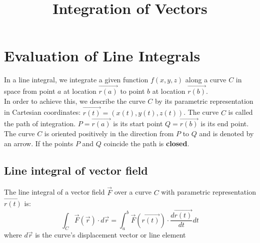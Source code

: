 \documentclass[11pt]{article}
\title{Integration of Vectors}
\begin{document}
\maketitle
    \section{Evaluation of Line Integrals}\label{sec:evaluation-of-line-integrals}
        In a line integral, we integrate a given function $f(x,y,z)$ along a curve $C$
        in space from point $a$ at location $\vec{r(a)}$ to point $b$ at location $\vec{r(b)}$.
        \\
        In order to achieve this, we describe the curve $C$ by its parametric representation in Cartesian coordinates:
        $\vec{r(t)} = (x(t), y(t), z(t))$.
        The curve $C$ is called the path of integration. $P = \vec{r(a)}$ is its start point $Q = \vec{r(b)}$ is its end point.
        The curve $C$ is oriented positively in the direction from $P$ to $Q$ and is denoted by an arrow.
        If the points $P$ and $Q$ coincide the path is \textbf{closed}.

        \subsection{Line integral of vector field}\label{subsec:line-integral-of-vector-field}
            The line integral of a vector field $\vec{F}$ over a curve $C$ with parametric representation
            $\vec{r(t)}$ is:
            \begin{equation}
                \label{eq:equation}
                \int_{C} \vec{F}(\vec{r}) \cdot d\vec{r} = \int_{a}^{b} \vec{F}(\vec{r(t)}) \cdot \frac{d\vec{r(t)}}{dt} dt
            \end{equation}
            where $d\vec{r}$ is the curve's displacement vector or line element
\end{document}
